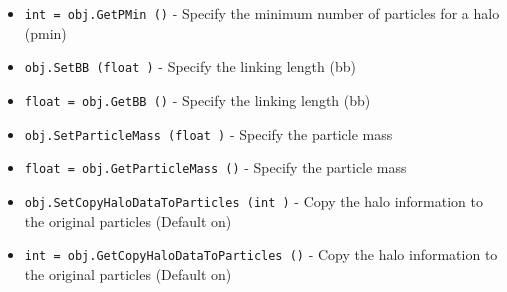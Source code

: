 \begin{itemize}
\item  \verb|int = obj.GetPMin ()| -  Specify the minimum number of particles for a halo (pmin)

\item  \verb|obj.SetBB (float )| -  Specify the linking length (bb)

\item  \verb|float = obj.GetBB ()| -  Specify the linking length (bb)

\item  \verb|obj.SetParticleMass (float )| -  Specify the particle mass

\item  \verb|float = obj.GetParticleMass ()| -  Specify the particle mass

\item  \verb|obj.SetCopyHaloDataToParticles (int )| -  Copy the halo information to the original particles (Default on)

\item  \verb|int = obj.GetCopyHaloDataToParticles ()| -  Copy the halo information to the original particles (Default on)

\end{itemize}
